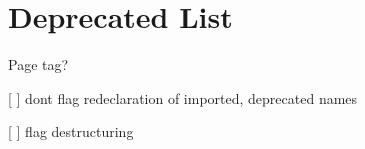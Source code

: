 \chapter{Deprecated List}
\hypertarget{deprecated}{}\label{deprecated}

\begin{DoxyRefList}
\item[Page \doxylink{md_node__modules_2eslint-plugin-import_2docs_2rules_2no-deprecated}{import/no-\/deprecated} ]\label{deprecated__deprecated000001}%
%
tag?
\begin{DoxyItemize}
\item \mbox{[} \mbox{]} don\textquotesingle{}t flag redeclaration of imported, deprecated names
\item \mbox{[} \mbox{]} flag destructuring 
\end{DoxyItemize}
\end{DoxyRefList}